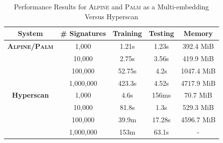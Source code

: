 \begin{table}[ht!]
\centering
\begin{tabular}{| c | c | c | c | c |}
\hline
System & \# Signatures & Training & Testing & Memory \\
\hline
\hline
\textbf{\textsc{Alpine}/\textsc{Palm}} & 1,000 &  1.21s &  1.23s & 392.4 MiB \\
& 10,000 & 2.75s & 3.56s & 419.9 MiB \\
& 100,000 & 52.75s & 4.2s & 1047.4 MiB \\
& 1,000,000 & 423.3s & 4.52s & 4717.9 MiB \\
\hline
\textbf{Hyperscan} & 1,000 & 4.6s & 156ms & 70.7 MiB \\
& 10,000 & 81.8s & 1.3s & 529.3 MiB \\
& 100,000 & 39.9m & 17.28s & 4596.7 MiB \\
& 1,000,000 & 153m & 63.1s & - \\
\hline
\end{tabular}
\caption{Performance Results for \textsc{Alpine} and \textsc{Palm} as a Multi-embedding Versus Hyperscan}
\label{table:performanceresults}
\end{table}

